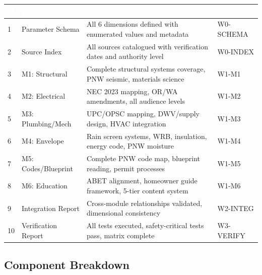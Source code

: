 \documentclass[11pt,letterpaper]{article}
\newcommand{\tableheader}[1]{\textbf{\sffamily\textcolor{white}{#1}}}
\begin{document}
\begin{center}
\begin{tabularx}{\textwidth}{C{0.5cm}L{3.5cm}XC{2cm}}
\toprule
{}
\tableheader{\#} & \tableheader{Deliverable} & \tableheader{Acceptance Criteria} & \tableheader{Spec} \\
 & Parameter Schema & All 6 dimensions defined with enumerated values and metadata & W0-SCHEMA \\
2 & Source Index & All sources catalogued with verification dates and authority level & W0-INDEX \\
3 & M1: Structural & Complete structural systems coverage, PNW seismic, materials science & W1-M1 \\
4 & M2: Electrical & NEC 2023 mapping, OR/WA amendments, all audience levels & W1-M2 \\
5 & M3: Plumbing/Mech & UPC/OPSC mapping, DWV/supply design, HVAC integration & W1-M3 \\
6 & M4: Envelope & Rain screen systems, WRB, insulation, energy code, PNW moisture & W1-M4 \\
7 & M5: Codes/Blueprint & Complete PNW code map, blueprint reading, permit processes & W1-M5 \\
8 & M6: Education & ABET alignment, homeowner guide framework, 5-tier content system & W1-M6 \\
9 & Integration Report & Cross-module relationships validated, dimensional consistency & W2-INTEG \\
10 & Verification Report & All tests executed, safety-critical tests pass, matrix complete & W3-VERIFY \\
\bottomrule
\end{tabularx}
\end{center}

\subsection{Component Breakdown}
\end{document}
